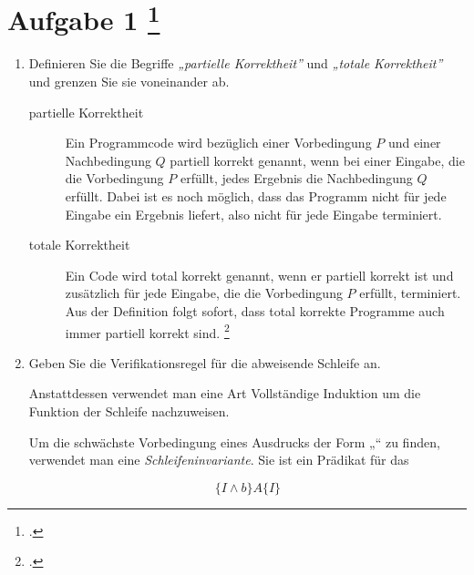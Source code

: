 \documentclass{lehramt-informatik-aufgabe}
\begin{document}
\let\wp=\liWpKalkuel
\let\equivalent=\liWpEquivalent
\let\erklaerung=\liWpErklaerung

\section{Aufgabe 1
\footcite{66116:2020:09}}

\begin{enumerate}


\item Definieren Sie die Begriffe \emph{„partielle Korrektheit”} und
\emph{„totale Korrektheit”} und grenzen Sie sie voneinander ab.

\begin{liAntwort}
\begin{description}
\item[partielle Korrektheit]

Ein Programmcode wird bezüglich einer Vorbedingung $P$ und einer
Nachbedingung $Q$ partiell korrekt genannt, wenn bei einer Eingabe, die
die Vorbedingung $P$ erfüllt, jedes Ergebnis die Nachbedingung $Q$
erfüllt. Dabei ist es noch möglich, dass das Programm nicht für jede
Eingabe ein Ergebnis liefert, also nicht für jede Eingabe terminiert.

\item[totale Korrektheit]

Ein Code wird total korrekt genannt, wenn er partiell korrekt ist und
zusätzlich für jede Eingabe, die die Vorbedingung $P$ erfüllt,
terminiert. Aus der Definition folgt sofort, dass total korrekte
Programme auch immer partiell korrekt sind.
\footcite{wiki:korrektheit}
\end{description}
\end{liAntwort}


\item Geben Sie die Verifikationsregel für die abweisende Schleife
an.

\begin{liAntwort}
Anstattdessen verwendet man eine Art Vollständige Induktion um die
Funktion der Schleife nachzuweisen.

Um die schwächste Vorbedingung eines Ausdrucks der Form
„“ zu finden, verwendet man eine
\emph{Schleifeninvariante}. Sie ist ein Prädikat für das

\begin{displaymath}
\{ I \wedge b \} A \{ I \}
\end{displaymath}


\end{liAntwort}
\end{enumerate}
\end{document}
